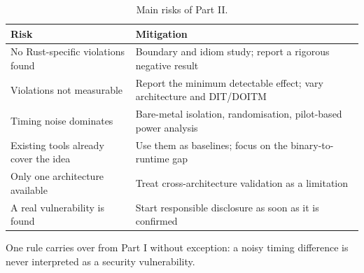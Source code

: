 \begin{table}[htbp]
\centering
\small
\renewcommand{\arraystretch}{1.18}
\begin{tabular}{@{}P{0.38\textwidth}P{0.52\textwidth}@{}}
\toprule
Risk & Mitigation \\
\midrule
No Rust-specific violations found & Boundary and idiom study; report a rigorous negative result \\
Violations not measurable & Report the minimum detectable effect; vary architecture and DIT/DOITM \\
Timing noise dominates & Bare-metal isolation, randomisation, pilot-based power analysis \\
Existing tools already cover the idea & Use them as baselines; focus on the binary-to-runtime gap \\
Only one architecture available & Treat cross-architecture validation as a limitation \\
A real vulnerability is found & Start responsible disclosure as soon as it is confirmed \\
\bottomrule
\end{tabular}
\caption{Main risks of Part II.}
\label{tab:risks}
\end{table}

One rule carries over from Part I without exception: a noisy timing difference is never interpreted as a security vulnerability.
